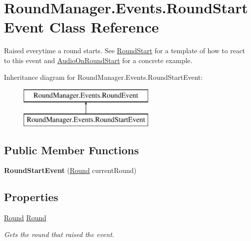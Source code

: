 \hypertarget{class_round_manager_1_1_events_1_1_round_start_event}{}\section{Round\+Manager.\+Events.\+Round\+Start\+Event Class Reference}
\label{class_round_manager_1_1_events_1_1_round_start_event}


Raised everytime a round starts. See \hyperlink{class_round_manager_1_1_round_start}{Round\+Start} for a template of how to react to this event and \hyperlink{class_round_manager_1_1_audio_on_round_start}{Audio\+On\+Round\+Start} for a concrete example.  


Inheritance diagram for Round\+Manager.\+Events.\+Round\+Start\+Event\+:\begin{figure}[H]
\begin{center}
\leavevmode
\includegraphics[height=2.000000cm]{class_round_manager_1_1_events_1_1_round_start_event}
\end{center}
\end{figure}
\subsection*{Public Member Functions}
\begin{DoxyCompactItemize}
\item 
\hypertarget{class_round_manager_1_1_events_1_1_round_start_event_a22616a9be72dff7325262671f44fb1d2}{}{\bfseries Round\+Start\+Event} (\hyperlink{class_round_manager_1_1_round}{Round} current\+Round)\label{class_round_manager_1_1_events_1_1_round_start_event_a22616a9be72dff7325262671f44fb1d2}

\end{DoxyCompactItemize}
\subsection*{Properties}
\begin{DoxyCompactItemize}
\item 
\hyperlink{class_round_manager_1_1_round}{Round} \hyperlink{class_round_manager_1_1_events_1_1_round_start_event_a03a06a2905d11b967ed45d4f902c5f93}{Round}
\begin{DoxyCompactList}\small\item\em Gets the round that raised the event. \end{DoxyCompactList}\end{DoxyCompactItemize}


